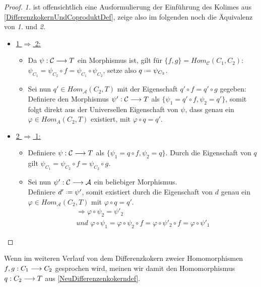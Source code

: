 \documentclass[10pt,a4paper]{report}
\newcommand{\functionfront}[3]{\nolinebreak{#1:#2 \longrightarrow #3}}
\newcommand*{\defeq}{\mathrel{\vcenter{\baselineskip0.5ex \lineskiplimit0pt
                     \hbox{\scriptsize.}\hbox{\scriptsize.}}}%
                     =}
\begin{document}
\begin{proof}
\textit{1.} ist offensichtlich eine Ausformulierung der Einführung des Kolimes aus \cref{DifferenzkokernUndCoproduktDef}, zeige also im folgenden noch die Äquivalenz von \textit{1.} und \textit{2.}
\begin{itemize}
\item \underline{1 $\Rightarrow$ 2:}
\begin{itemize}
\item[] Da $\functionfront{\psi}{\mathcal{C}}{T}$ ein Morphismus ist, gilt für $\lbrace f,g \rbrace = Hom_{\mathcal{C}}(C_1,C_2)$:\\ $\psi_{C_1} = \psi_{C_2} \circ f = \psi_{C_1} \circ \psi_{C_2}$, setze also 
 $q  \defeq \psi_{C_2}$.
\item[] Sei nun $q' \in Hom_{\mathcal{A}}(C_2,T)$ mit der Eigenschaft $q' \circ f = q' \circ g$ gegeben:\\
 Definiere den Morphismus $\functionfront{\psi '}{\mathcal{C}}{T}$ als $\lbrace \psi_1 = q' \circ f , \psi_2 = q' \rbrace$,  somit folgt direkt aus der Universellen Eigenschaft von $\psi$, dass genau ein $\varphi \in Hom_{A}(C_2,T)$ existiert, mit $ \varphi \circ q = q '$.
\end{itemize}
\item \underline{2 $\Rightarrow$ 1:}
\begin{itemize}
\item[] Definiere $\functionfront{\psi }{\mathcal{C}}{T}$ als $\lbrace \psi_1 = q \circ f , \psi_2 = q \rbrace$.
Durch die Eigenschaft von $q$ gilt $\psi_{C_1} = \psi_{C_2} \circ f = \psi_{C_2} \circ g$.
\item[] Sei nun $\functionfront{\psi '}{\mathcal{C}}{\mathcal{A}}$ ein beliebiger Morphismus.\\
Definiere $d' \defeq \psi '$, somit existiert durch die Eigenschaft von $d$ genau ein $\varphi \in Hom_{\mathcal{A}}(C_2,T)$ mit $\varphi \circ q = q'$.
\begin{gather*}
\Rightarrow \varphi \circ \psi_2 = \psi '_2 \\
\textit{und }\varphi \circ \psi_1 = \varphi \circ \psi_2 \circ f = \varphi \circ \psi '_2 \circ f = \varphi \circ \psi '_1
\end{gather*}
\end{itemize}
\end{itemize}
\end{proof}
Wenn im weiteren Verlauf von dem Differenzkokern zweier Homomorphismen $\functionfront{f,g}{C_1}{C_2}$ gesprochen wird, meinen wir damit den Homomorphismus $\functionfront{q}{C_2}{T}$ aus \cref{NeuDifferenzenkokerndef}.\\
\end{document}
